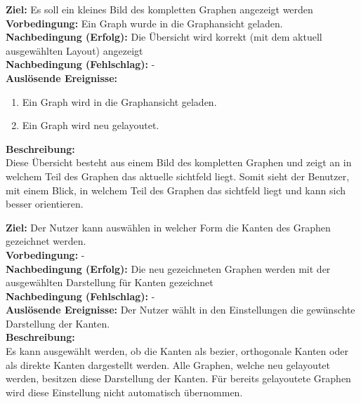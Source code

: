 \label{fa:uebersicht}
\textbf{Ziel:} Es soll ein kleines Bild des kompletten Graphen angezeigt werden \\
\textbf{Vorbedingung:} Ein Graph wurde in die Graphansicht geladen.\\
\textbf{Nachbedingung (Erfolg):} Die Übersicht wird korrekt (mit dem aktuell ausgewählten Layout) angezeigt \\
\textbf{Nachbedingung (Fehlschlag):} -\\
\textbf{Auslösende Ereignisse:}
\begin{enumerate}[nolistsep, label=(\alph*)]
  \item Ein Graph wird in die Graphansicht geladen.
  \item Ein Graph wird neu gelayoutet.
\end{enumerate}
\textbf{Beschreibung:}\\
Diese Übersicht besteht aus einem Bild des kompletten Graphen und zeigt an in welchem Teil des Graphen das aktuelle \gls{sichtfeld} liegt. Somit sieht der Benutzer, mit einem Blick, in welchem Teil des Graphen das \gls{sichtfeld} liegt und kann sich besser orientieren.

\label{fa:darst-kanten}
\textbf{Ziel:} Der Nutzer kann auswählen in welcher Form die Kanten des Graphen gezeichnet werden. \\
\textbf{Vorbedingung:} -\\
\textbf{Nachbedingung (Erfolg):} Die neu gezeichneten Graphen werden mit der ausgewählten Darstellung für Kanten gezeichnet \\
\textbf{Nachbedingung (Fehlschlag):} -\\
\textbf{Auslösende Ereignisse:} Der Nutzer wählt in den Einstellungen die gewünschte Darstellung der Kanten.\\
\textbf{Beschreibung:}\\
Es kann ausgewählt werden, ob die Kanten als \gls{bezier}, orthogonale Kanten oder als direkte Kanten dargestellt werden. Alle Graphen, welche neu gelayoutet werden, besitzen diese Darstellung der Kanten. Für bereits gelayoutete Graphen wird diese Einstellung nicht automatisch übernommen.


